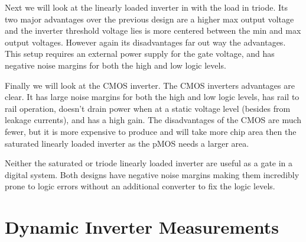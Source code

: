 \documentclass[titlepage, 12pt]{article}
\begin{document}
    Next we will look at the linearly loaded inverter in with the load
    in triode. Its two major advantages over the previous design are a
    higher max output voltage and the inverter threshold voltage lies
    is more centered between the min and max output voltages. However
    again its disadvantages far out way the advantages. This setup
    requires an external power supply for the gate voltage, and has
    negative noise margins for both the high and low logic levels.

    Finally we will look at the CMOS inverter. The CMOS inverters
    advantages are clear. It has large noise margins for both the high
    and low logic levels, has rail to rail operation, doesn't drain
    power when at a static voltage level (besides from leakage
    currents), and has a high gain. The disadvantages of the CMOS are
    much fewer, but it is more expensive to produce and will take more
    chip area then the saturated linearly loaded inverter as the pMOS
    needs a larger area.

    Neither the saturated or triode linearly loaded inverter are useful
    as a gate in a digital system. Both designs have negative noise
    margins making them incredibly prone to logic errors without an
    additional converter to fix the logic levels.

    \section{Dynamic Inverter Measurements}
\end{document}
